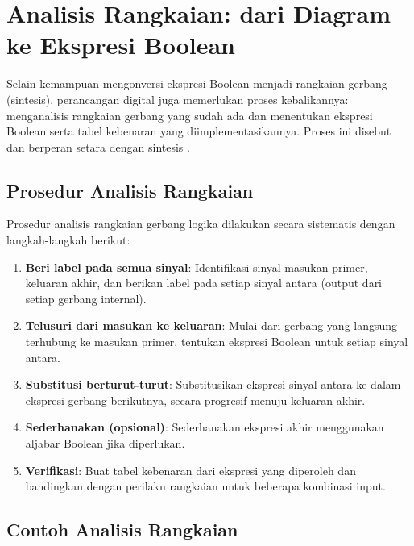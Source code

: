 \section{Analisis Rangkaian: dari Diagram ke Ekspresi Boolean}

Selain kemampuan mengonversi ekspresi Boolean menjadi rangkaian gerbang (sintesis), perancangan digital juga memerlukan proses kebalikannya: menganalisis rangkaian gerbang yang sudah ada dan menentukan ekspresi Boolean serta tabel kebenaran yang diimplementasikannya. Proses ini disebut  dan berperan setara dengan sintesis \cite{rosen2019}.

\subsection{Prosedur Analisis Rangkaian}

Prosedur analisis rangkaian gerbang logika dilakukan secara sistematis dengan langkah-langkah berikut:

\begin{enumerate}
  \item \textbf{Beri label pada semua sinyal}: Identifikasi sinyal masukan primer, keluaran akhir, dan berikan label pada setiap sinyal antara (output dari setiap gerbang internal).
  \item \textbf{Telusuri dari masukan ke keluaran}: Mulai dari gerbang yang langsung terhubung ke masukan primer, tentukan ekspresi Boolean untuk setiap sinyal antara.
  \item \textbf{Substitusi berturut-turut}: Substitusikan ekspresi sinyal antara ke dalam ekspresi gerbang berikutnya, secara progresif menuju keluaran akhir.
  \item \textbf{Sederhanakan (opsional)}: Sederhanakan ekspresi akhir menggunakan aljabar Boolean jika diperlukan.
  \item \textbf{Verifikasi}: Buat tabel kebenaran dari ekspresi yang diperoleh dan bandingkan dengan perilaku rangkaian untuk beberapa kombinasi input.
\end{enumerate}

\subsection{Contoh Analisis Rangkaian}

